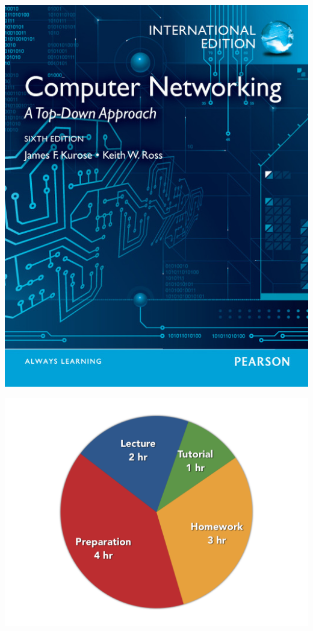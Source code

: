 \begin{frame}
\begin{center}
	\includegraphics[scale=0.3]{figures/textbook-cover.jpg}
\end{center}
\end{frame}

\begin{frame}
\begin{center}
	\includegraphics[scale=0.3]{figures/workload-chart.png}
\end{center}
\end{frame}


